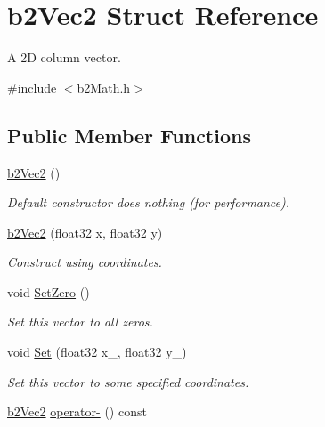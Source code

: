 \hypertarget{structb2_vec2}{\section{b2\-Vec2 Struct Reference}
\label{structb2_vec2}
}


A 2\-D column vector.  




{\ttfamily \#include $<$b2\-Math.\-h$>$}

\subsection*{Public Member Functions}
\begin{DoxyCompactItemize}
\item 
\hypertarget{structb2_vec2_a9171b31deb83af96872f99689939a12f}{\hyperlink{structb2_vec2_a9171b31deb83af96872f99689939a12f}{b2\-Vec2} ()}\label{structb2_vec2_a9171b31deb83af96872f99689939a12f}

\begin{DoxyCompactList}\small\item\em Default constructor does nothing (for performance). \end{DoxyCompactList}\item 
\hypertarget{structb2_vec2_aa8a2f026420a84bbbc62f3a3de2041d6}{\hyperlink{structb2_vec2_aa8a2f026420a84bbbc62f3a3de2041d6}{b2\-Vec2} (float32 x, float32 y)}\label{structb2_vec2_aa8a2f026420a84bbbc62f3a3de2041d6}

\begin{DoxyCompactList}\small\item\em Construct using coordinates. \end{DoxyCompactList}\item 
\hypertarget{structb2_vec2_a5c6cbe27cfb29c6dbb29b9a3285b88d0}{void \hyperlink{structb2_vec2_a5c6cbe27cfb29c6dbb29b9a3285b88d0}{Set\-Zero} ()}\label{structb2_vec2_a5c6cbe27cfb29c6dbb29b9a3285b88d0}

\begin{DoxyCompactList}\small\item\em Set this vector to all zeros. \end{DoxyCompactList}\item 
\hypertarget{structb2_vec2_a4d61640a645e470a50b451307d8e94c3}{void \hyperlink{structb2_vec2_a4d61640a645e470a50b451307d8e94c3}{Set} (float32 x\-\_\-, float32 y\-\_\-)}\label{structb2_vec2_a4d61640a645e470a50b451307d8e94c3}

\begin{DoxyCompactList}\small\item\em Set this vector to some specified coordinates. \end{DoxyCompactList}\item 
\hypertarget{structb2_vec2_ab1f648091d3cba00b4c132758fcf4450}{\hyperlink{structb2_vec2}{b2\-Vec2} \hyperlink{structb2_vec2_ab1f648091d3cba00b4c132758fcf4450}{operator-\/} () const }\label{structb2_vec2_ab1f648091d3cba00b4c132758fcf4450}


\end{DoxyCompactItemize}
